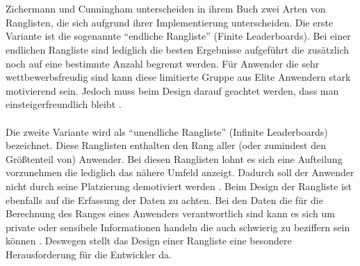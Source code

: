\documentclass[a4paper,12pt]{scrartcl}
\begin{document}
\\\\
Zichermann und Cunningham unterscheiden in ihrem Buch zwei Arten von Ranglisten, die sich aufgrund ihrer Implementierung unterscheiden. Die erste Variante ist die sogenannte \enquote{endliche Rangliste} (Finite Leaderboards)\cite{Zichermann2011}. Bei einer endlichen Rangliste sind lediglich die besten Ergebnisse aufgeführt die zusätzlich noch auf eine bestimmte Anzahl begrenzt werden. Für Anwender die sehr wettbewerbsfreudig sind kann diese limitierte Gruppe aus Elite Anwendern stark motivierend sein. Jedoch muss beim Design darauf geachtet werden, dass man einsteigerfreundlich bleibt \cite{Zichermann2011}. 
\\\\
Die zweite Variante wird als \enquote{unendliche Rangliste} (Infinite Leaderboards) bezeichnet. Diese Ranglisten enthalten den Rang aller (oder zumindest den Größtenteil von) Anwender. Bei diesen Ranglisten lohnt es sich eine Aufteilung vorzunehmen die lediglich das nähere Umfeld anzeigt. Dadurch soll der Anwender nicht durch seine Platzierung demotiviert werden \cite{Zichermann2011}. Beim Design der Rangliste ist ebenfalls auf die Erfassung der Daten zu achten. Bei den Daten die für die Berechnung des Ranges eines Anwenders verantwortlich sind kann es sich um private oder sensibele Informationen handeln die auch schwierig zu beziffern sein können \cite{Zichermann2011}. Deswegen stellt das Design einer Rangliste eine besondere Herausforderung für die Entwickler da.
\end{document}
